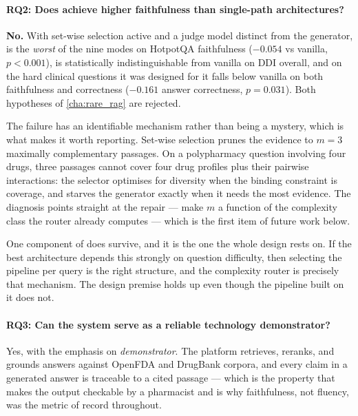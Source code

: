 \paragraph{RQ2: Does \rarerag{} achieve higher faithfulness than single-path
architectures?}
\textbf{No.}
With set-wise selection active and a judge model distinct from the generator,
\rarerag{} is the \emph{worst} of the nine modes on HotpotQA
faithfulness ($-0.054$ vs vanilla, $p < 0.001$), is statistically
indistinguishable from vanilla on DDI overall, and on the hard clinical questions
it was designed for it falls below vanilla on both faithfulness and correctness
($-0.161$ answer correctness, $p = 0.031$).
Both hypotheses of \cref{cha:rare_rag} are rejected.

The failure has an identifiable mechanism rather than being a mystery, which is
what makes it worth reporting.
Set-wise selection prunes the evidence to $m = 3$ maximally complementary
passages.
On a polypharmacy question involving four drugs, three passages cannot cover four
drug profiles plus their pairwise interactions: the selector optimises for
diversity when the binding constraint is coverage, and starves the generator
exactly when it needs the most evidence.
The diagnosis points straight at the repair --- make $m$ a function of the
complexity class the router already computes --- which is the first item of future
work below.

One component of \rarerag{} does survive, and it is the one the whole design rests
on.  If the best architecture depends this strongly on question difficulty, then
selecting the pipeline per query is the right structure, and the complexity router
is precisely that mechanism.  The design premise holds up even though the
pipeline built on it does not.

\paragraph{RQ3: Can the system serve as a reliable technology demonstrator?}
Yes, with the emphasis on \emph{demonstrator}.
The platform retrieves, reranks, and grounds answers against OpenFDA and DrugBank
corpora, and every claim in a generated answer is traceable to a cited passage ---
which is the property that makes the output checkable by a pharmacist and is why
faithfulness, not fluency, was the metric of record throughout.

